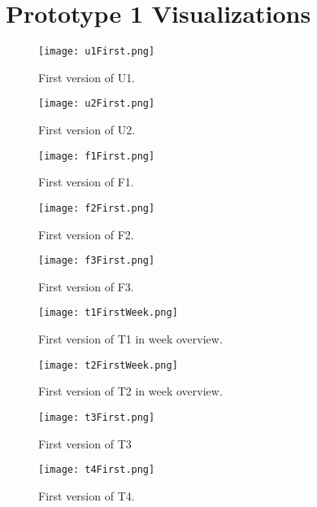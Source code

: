 \chapter{Prototype 1 Visualizations}
\label{prototype1Viz}

\begin{figure}[h!]
\centering
\texttt{[image: u1First.png]}
\caption[First version of U1]{First version of U1.}
\end{figure}

\begin{figure}[h!]
\centering
\texttt{[image: u2First.png]}
\caption[First version of U2]{First version of U2.}
\end{figure}

\begin{figure}[h!]
\centering
\texttt{[image: f1First.png]}
\caption[First version of F1]{First version of F1.}
\end{figure}

\begin{figure}[h!]
\centering
\texttt{[image: f2First.png]}
\caption[First version of F2]{First version of F2.}
\end{figure}

\begin{figure}[h!]
\centering
\texttt{[image: f3First.png]}
\caption[First version of F3]{First version of F3.}
\end{figure}

\begin{figure}[h!]
\centering
\texttt{[image: t1FirstWeek.png]}
\caption[First version of T1]{First version of T1 in week overview.}
\end{figure}

\begin{figure}[h!]
\centering
\texttt{[image: t2FirstWeek.png]}
\caption[First version of T2]{First version of T2 in week overview.}
\end{figure}

\begin{figure}[h!]
\centering
\texttt{[image: t3First.png]}
\caption[First version of T3]{First version of T3}
\end{figure}

\begin{figure}[h!]
\centering
\texttt{[image: t4First.png]}
\caption[First version of T4]{First version of T4.}
\end{figure}

